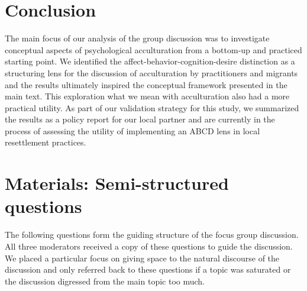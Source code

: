 \documentclass[man, 12pt, a4paper]{apa7}
\begin{document}
\section{Conclusion}

The main focus of our analysis of the group discussion was to investigate conceptual aspects of psychological acculturation from a bottom-up and practiced starting point. We identified the affect-behavior-cognition-desire distinction as a structuring lens for the discussion of acculturation by practitioners and migrants and the results ultimately inspired the conceptual framework presented in the main text. This exploration what we mean with acculturation also had a more practical utility. As part of our validation strategy for this study, we summarized the results as a policy report for our local partner and are currently in the process of assessing the utility of implementing an ABCD lens in local resettlement practices.


\printbibliography


\appendix

\begin{center}




\end{center}


\section{Materials: Semi-structured questions}\label{app:AppendixQuestions}

The following questions form the guiding structure of the focus group discussion. All three moderators received a copy of these questions to guide the discussion. We placed a particular focus on giving space to the natural discourse of the discussion and only referred back to these questions if a topic was saturated or the discussion digressed from the main topic too much. 
\end{document}
